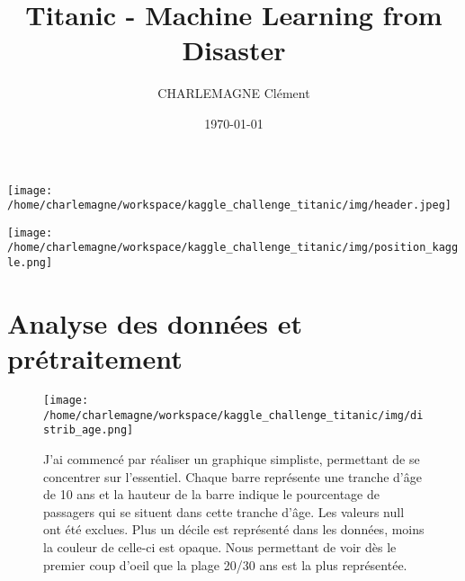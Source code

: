 \documentclass[9pt]{article}
\title{Titanic - Machine Learning from Disaster}
\author{CHARLEMAGNE Clément}
\date{\today}
\begin{document}
\maketitle

\begin{center}
    \texttt{[image: /home/charlemagne/workspace/kaggle\_challenge\_titanic/img/header.jpeg]}
\end{center}

\vspace*{100pt}

\begin{center}
    \texttt{[image: /home/charlemagne/workspace/kaggle\_challenge\_titanic/img/position\_kaggle.png]}
\end{center}

\clearpage
\section{\textcolor{section}{Analyse des données et prétraitement}}

\begin{figure}[htbp]
    \centering
    \begin{minipage}{0.45\textwidth}
        \centering
        \texttt{[image: /home/charlemagne/workspace/kaggle\_challenge\_titanic/img/distrib\_age.png]}
    \end{minipage}\hfill
    \begin{minipage}{0.45\textwidth}
        J'ai commencé par réaliser un graphique simpliste, permettant de se concentrer sur l'essentiel.
         Chaque barre représente une tranche d'âge de 10 ans et la hauteur de la barre indique le pourcentage 
         de passagers qui se situent dans cette tranche d'âge. Les valeurs null ont été exclues. Plus un décile
          est représenté dans les données, moins la couleur de celle-ci est opaque. Nous permettant de voir dès 
          le premier coup d'oeil que la plage 20/30 ans est la plus représentée.
    \end{minipage}
\end{figure}
\end{document}

